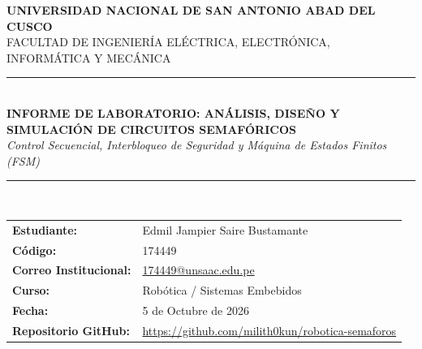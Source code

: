 \documentclass[11pt,a4paper]{article}
\begin{document}
\begin{center}
    {\Large\textbf{UNIVERSIDAD NACIONAL DE SAN ANTONIO ABAD DEL CUSCO}}\\[0.2cm]
    {\large FACULTAD DE INGENIERÍA ELÉCTRICA, ELECTRÓNICA, INFORMÁTICA Y MECÁNICA}\\[0.4cm]
    \rule{\linewidth}{0.8pt}\\[0.3cm]
    {\LARGE\textbf{INFORME DE LABORATORIO: ANÁLISIS, DISEÑO Y SIMULACIÓN DE CIRCUITOS SEMAFÓRICOS}}\\[0.2cm]
    {\large\textit{Control Secuencial, Interbloqueo de Seguridad y Máquina de Estados Finitos (FSM)}}\\[0.3cm]
    \rule{\linewidth}{0.8pt}\\[0.4cm]

    \begin{tabular}{ll}
        \textbf{Estudiante:} & Edmil Jampier Saire Bustamante \\
        \textbf{Código:} & 174449 \\
        \textbf{Correo Institucional:} & \href{mailto:174449@unsaac.edu.pe}{174449@unsaac.edu.pe} \\
        \textbf{Curso:} & Robótica / Sistemas Embebidos \\
        \textbf{Fecha:} & 5 de Octubre de 2026 \\
        \textbf{Repositorio GitHub:} & \url{https://github.com/milith0kun/robotica-semaforos} \\
    \end{tabular}
\end{center}

\vspace{0.4cm}

\begin{abstract}
En esta práctica de laboratorio se diseñaron, analizaron teóricamente, implementaron y simularon cuatro circuitos secuenciales y de control digital aplicados a la semaforización urbana inteligente sobre la plataforma Arduino UNO. Se aborda desde el parpadeo periódico elemental de un diodo emisor de luz (LED), pasando por el ciclo vehicular normado (MUTCD), el semáforo mixto vehicular-peatonal con despeje de seguridad (\textit{All-Red}), hasta culminar en un semáforo a demanda gobernado por pulsador y una Máquina de Estados Finitos (FSM) no bloqueante con temporización mediante \texttt{millis()}. El informe incluye cálculos rigurosos por Ley de Ohm, disipación de potencia térmica, esquemas de conexión, tablas de estados y capturas de las simulaciones ejecutadas en Wokwi.
\end{abstract}
\end{document}
